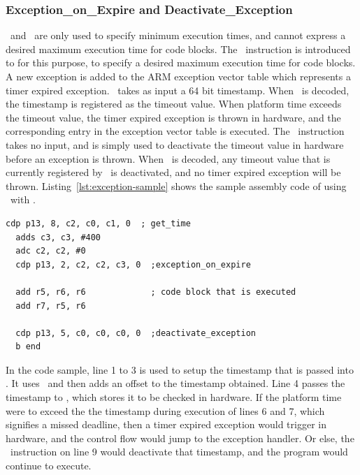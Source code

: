 \subsubsection{Exception\_on\_Expire and Deactivate\_Exception}
\label{sec:exception_in_expire_definition}
\Delayuntil\ and \delayandset\ are only used to specify minimum execution times, and cannot express a desired maximum execution time for code blocks.
The \exceptiononexpire\ instruction is introduced to for this purpose, to specify a desired maximum execution time for code blocks.
A new exception is added to the ARM exception vector table which represents a timer expired exception. 
\Exceptiononexpire\ takes as input a 64 bit timestamp.
When \exceptiononexpire\ is decoded, the timestamp is registered as the timeout value. 
When platform time exceeds the timeout value, the timer expired exception is thrown in hardware, and the corresponding entry in the exception vector table is executed.
The \deactivateexception\ instruction takes no input, and is simply used to deactivate the timeout value in hardware before an exception is thrown.
When \deactivateexception\ is decoded, any timeout value that is currently registered by \exceptiononexpire\ is deactivated, and no timer expired exception will be thrown. 
Listing~\ref{lst:exception-sample} shows the sample assembly code of using \exceptiononexpire\ with \deactivateexception.  

\begin{lstlisting}[float=h, label=lst:exception-sample,caption=Sample assembly code of exception\_on\_expire and deactivate\_exception ]
  cdp p13, 8, c2, c0, c1, 0  ; get_time
  adds c3, c3, #400
  adc c2, c2, #0
  cdp p13, 2, c2, c2, c3, 0  ;exception_on_expire

  add r5, r6, r6             ; code block that is executed
  add r7, r5, r6
  
  cdp p13, 5, c0, c0, c0, 0  ;deactivate_exception
  b end
\end{lstlisting}

In the code sample, line 1 to 3 is used to setup the timestamp that is passed into \exceptiononexpire.
It uses \gettime\ and then adds an offset to the timestamp obtained. 
Line 4 passes the timestamp to \exceptiononexpire, which stores it to be checked in hardware. 
If the platform time were to exceed the the timestamp during execution of lines 6 and 7, which signifies a missed deadline, then a timer expired exception would trigger in hardware, and the control flow would jump to the exception handler. 
Or else, the \deactivateexception\ instruction on line 9 would deactivate that timestamp, and the program would continue to execute.

